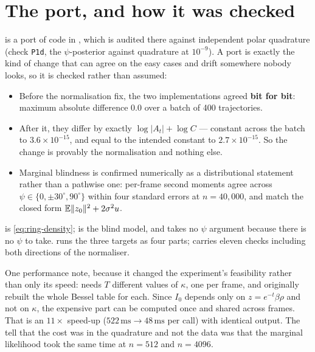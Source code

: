 \section{The port, and how it was checked}
\label{sec:ring-port}

 is a port of code in , which is
audited there against independent polar quadrature (check \texttt{P1d}, the $\psi$-posterior
against quadrature at $10^{-9}$). A port is exactly the kind of change that can agree on the
easy cases and drift somewhere nobody looks, so it is checked rather than assumed:

\begin{itemize}\itemsep2pt
\item Before the normalisation fix, the two implementations agreed \textbf{bit for bit}: maximum
      absolute difference $0.0$ over a batch of 400 trajectories.
\item After it, they differ by exactly $\log|A_t| + \log C$ --- constant across the batch to
      $3.6\times10^{-15}$, and equal to the intended constant to $2.7\times10^{-15}$. So the
      change is provably the normalisation and nothing else.
\item Marginal blindness is confirmed numerically as a distributional statement rather than a
      pathwise one: per-frame second moments agree across $\psi\in\{0,\pm30^\circ,90^\circ\}$
      within four standard errors at $n=40{,}000$, and match the closed form
      $\mathbb{E}\|z_0\|^2 + 2\sigma^2 u$.
\end{itemize}

\begin{codebox}
 is \eqref{eq:ring-density};
 is the blind model, and takes no $\psi$ argument
because there is no $\psi$ to take.  runs the three
targets as four parts;  carries eleven checks including both
directions of the normaliser.

One performance note, because it changed the experiment's feasibility rather than only its
speed:  needs $T$ different values of $\kappa$, one per
frame, and originally rebuilt the whole Bessel table for each. Since $I_0$ depends only on
$z = e^{-t}\beta\rho$ and not on $\kappa$, the expensive part can be computed once and shared
across frames. That is an $11\times$ speed-up ($522\,\mathrm{ms}\to48\,\mathrm{ms}$ per call)
with identical output. The tell that the cost was in the quadrature and not the data was that
the marginal likelihood took the same time at $n=512$ and $n=4096$.
\end{codebox}
